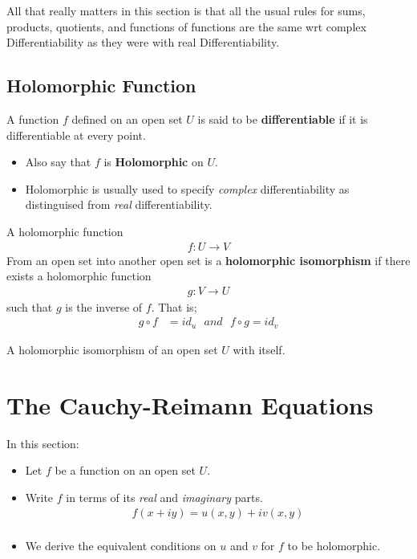 All that really matters in this section 
is that all the usual rules for sums, products, quotients, and functions of functions are the same 
wrt complex Differentiability as they were with real Differentiability.

\subsection{Holomorphic Function}
A function $f$ defined on an open set $U$ is said to be \textbf{differentiable} if it is differentiable at every point.
\begin{itemize}
	\item Also say that $f$ is \textbf{Holomorphic} on $U.$
	\item Holomorphic is usually used to specify \textit{complex} differentiability as distinguised from \textit{real} differentiability.
\end{itemize}


\begin{defn}
	A holomorphic function
	\begin{align*}
		f: U \to V
	\end{align*}
	From an open set into another open set is a \textbf{holomorphic isomorphism} if there exists a holomorphic function
	\begin{align*}
		g: V \to U
	\end{align*}
	such that $g$ is the inverse of $f.$ That is;
	\begin{align*}
		g \circ f &= id_u \,\,\,\,
		and \,\,\,\,
		f \circ g = id_v
	\end{align*}
\end{defn}

\begin{defn}
	A holomorphic isomorphism of an open set $U$ with itself.
\end{defn}

\section{The Cauchy-Reimann Equations}
In this section:
\begin{itemize}
	\item Let $f$ be a function on an open set $U.$
	\item Write $f$ in terms of its \textit{real} and \textit{imaginary} parts.
	\begin{align*}
		f(x + iy) = u(x, y) + iv(x, y) \\
	\end{align*}
	\item We derive the equivalent conditions on $u$ and $v$ for $f$ to be holomorphic.
\end{itemize}

